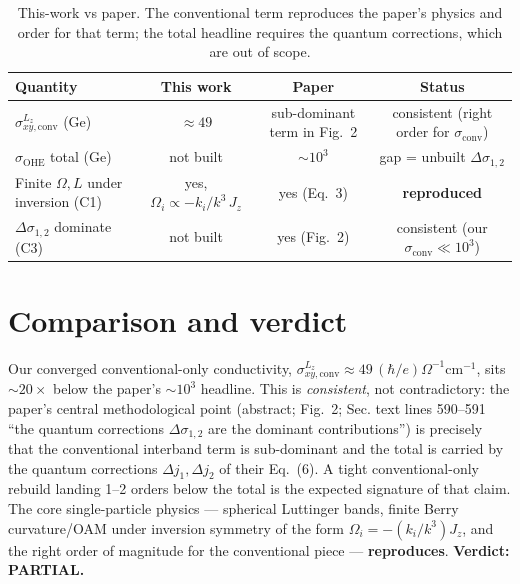 \documentclass[11pt]{article}
\begin{document}
\begin{table}[h]\centering
\begin{tabular}{lccc}
\toprule
Quantity & This work & Paper & Status\\
\midrule
$\sigma^{L_z}_{xy,\mathrm{conv}}$ (Ge) & $\approx 49$ & sub-dominant term in Fig.~2 & consistent (right order for $\sigma_{\mathrm{conv}}$)\\
$\sigma_{\mathrm{OHE}}$ total (Ge)     & not built    & $\sim 10^3$ & gap = unbuilt $\Delta\sigma_{1,2}$\\
Finite $\Omega,L$ under inversion (C1) & yes, $\Omega_i\propto -k_i/k^3\,J_z$ & yes (Eq.~3) & \textbf{reproduced}\\
$\Delta\sigma_{1,2}$ dominate (C3)     & not built    & yes (Fig.~2) & consistent (our $\sigma_{\mathrm{conv}}\ll10^3$)\\
\bottomrule
\end{tabular}
\caption{This-work vs paper. The conventional term reproduces the paper's physics and order for that
term; the total headline requires the quantum corrections, which are out of scope.}
\end{table}

\section{Comparison and verdict}
Our converged conventional-only conductivity, $\sigma^{L_z}_{xy,\mathrm{conv}}\approx49\,
(\hbar/e)\Omega^{-1}\mathrm{cm}^{-1}$, sits $\sim\!20\times$ below the paper's $\sim\!10^3$ headline.
This is \emph{consistent}, not contradictory: the paper's central methodological point (abstract;
Fig.~2; Sec. text lines 590--591 ``the quantum corrections $\Delta\sigma_{1,2}$ are the dominant
contributions'') is precisely that the conventional interband term is sub-dominant and the total is
carried by the quantum corrections $\Delta j_{1},\Delta j_{2}$ of their Eq.~(6). A tight
conventional-only rebuild landing 1--2 orders below the total is the expected signature of that claim.
The core single-particle physics --- spherical Luttinger bands, finite Berry curvature/OAM under
inversion symmetry of the form $\Omega_i=-(k_i/k^3)J_z$, and the right order of magnitude for the
conventional piece --- \textbf{reproduces}. \textbf{Verdict: PARTIAL.}
\end{document}
